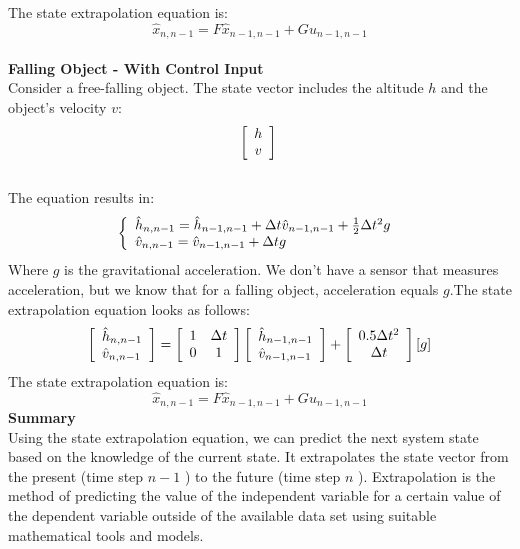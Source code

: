\documentclass[eng]{ajceam-class}
\begin{document}
The state extrapolation equation is:
$$
\hat{x}_{n,n-1} = {F}\hat{x}_{n-1,n-1} + {G}{u}_{n-1,n-1}
$$
\\
\textbf{Falling Object - With Control Input}\\
Consider a free-falling object. The state vector includes the altitude ${h}$ and the object's velocity ${v}$: 
$$
\left[\begin{array}{c}
{h} \\
{v} \\
\end{array}\right]\\
$$
\\
The equation  results in: 
\\
$$
\left\{\begin{array}{l}
\hat{h}_{n,n-1}=\hat{h}_{n-1,n-1}+\Delta t \hat{v}_{n-1,n-1} +\frac{1}{2} \Delta t^{2}{g} \\
\hat{v}_{n,n-1}=\hat{v}_{n-1,n-1}+\Delta t{g} \\
\end{array}\right.
\\
$$
Where ${g}$ is the gravitational acceleration.
We don't have a sensor that measures acceleration, but we know that for a falling object, acceleration equals ${g}$.The state extrapolation equation looks as follows:
\\
$$
\left[\begin{array}{l}
\hat{h}_{n, n-1} \\
\hat{v}_{n, n-1}
\end{array}\right]=\left[\begin{array}{cc}
1 & \Delta t \\
0 & 1
\end{array}\right]\left[\begin{array}{l}
\hat{h}_{n-1, n-1} \\
\hat{v}_{n-1, n-1}
\end{array}\right]+\left[\begin{array}{c}
0.5 \Delta t^{2} \\
\Delta t
\end{array}\right][g]
\\
$$
The state extrapolation equation is:
$$
\hat{x}_{n,n-1} = {F}\hat{x}_{n-1,n-1} + {G}{u}_{n-1,n-1}
$$
\textbf{Summary}\\
Using the state extrapolation equation, we can predict the next system state based on the knowledge of the current state. It extrapolates the state vector from the present (time step ${n-1}$ ) to the future (time step ${n}$ ). Extrapolation is the method of predicting the value of the independent variable for a certain value of the dependent variable outside of the available data set using suitable mathematical tools and models.
\end{document}

